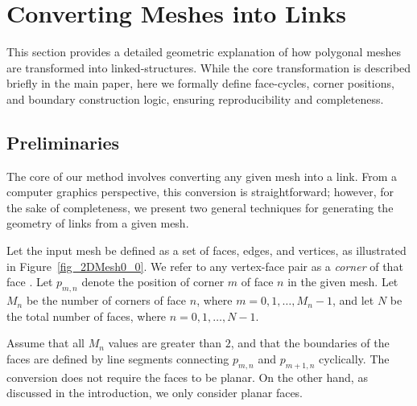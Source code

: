 \documentclass[times,twocolumn,final]{elsarticle}
\begin{document}


\section{Converting Meshes into Links}
\label{sec_converting}

This section provides a detailed geometric explanation of how polygonal meshes are transformed into linked-structures. While the core transformation is described briefly in the main paper, here we formally define face-cycles, corner positions, and boundary construction logic, ensuring reproducibility and completeness.

\subsection{Preliminaries}

The core of our method involves converting any given mesh into a link. From a computer graphics perspective, this conversion is straightforward; however, for the sake of completeness, we present two general techniques for generating the geometry of links from a given mesh. 

Let the input mesh be defined as a set of faces, edges, and vertices, as illustrated in Figure~\ref{fig_2DMesh0_0}. 
We refer to any vertex-face pair as a \textit{corner} of that face \cite{akleman1999guaranteeing}. Let $\textit{p}_{m,n}$ denote the position of corner $m$ of face $n$ in the given mesh. Let $M_n$ be the number of corners of face $n$, where $m = 0, 1, \ldots, M_n - 1$, and let $N$ be the total number of faces, where $n = 0, 1, \ldots, N - 1$.

Assume that all $M_n$ values are greater than $2$, and that the boundaries of the faces are defined by line segments connecting $\textit{p}_{m,n}$ and $\textit{p}_{m+1,n}$ cyclically. The conversion does not require the faces to be planar. On the other hand, as discussed in the introduction, we only consider planar faces.
\end{document}

